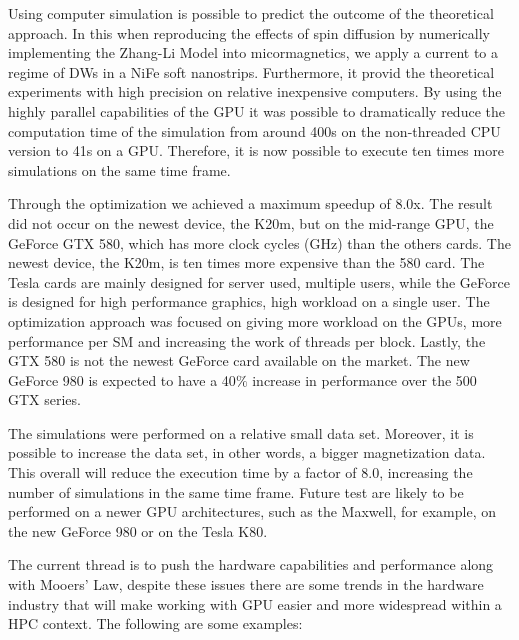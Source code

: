 Using computer simulation is possible to predict the outcome of the theoretical approach. In this when reproducing the effects of spin diffusion by numerically implementing the Zhang-Li Model into micormagnetics, we apply a current to a regime of DWs in a NiFe soft nanostrips. Furthermore, it provid the theoretical experiments with high precision on relative inexpensive computers. By using the highly parallel capabilities of the GPU it was possible to dramatically reduce the computation time of the simulation from around 400s on the non-threaded CPU version to 41s on a GPU. Therefore, it is now possible to execute ten times more simulations on the same time frame.

Through the optimization we achieved a maximum speedup of 8.0x. The result did not occur on the newest device, the K20m, but on the mid-range GPU, the GeForce GTX 580, which has more clock cycles (GHz) than the others cards. The newest device, the K20m, is ten times more expensive than the 580 card. The Tesla cards are mainly designed for server used, multiple users, while the GeForce is designed for high performance graphics, high workload on a single user. The  optimization approach was focused on giving more workload on the GPUs, more performance per SM and increasing the work of threads per block. Lastly, the GTX 580 is not the newest GeForce card available on the market. The new GeForce 980 is expected to have a 40$\%$ increase in performance over the 500 GTX series. 

The simulations were performed on a relative small data set. Moreover, it is possible to increase the data set, in other words, a bigger magnetization data. This overall will reduce the execution time by a factor of 8.0, increasing the number of simulations in the same time frame. Future test are likely to be performed on a newer GPU architectures, such as the Maxwell, for example, on the new GeForce 980 or on the Tesla K80.

The current thread is to push the hardware capabilities and performance along with Mooers' Law, despite these issues there are some trends in the hardware industry that will make working with GPU easier and more widespread within a HPC context. The following are some examples:

